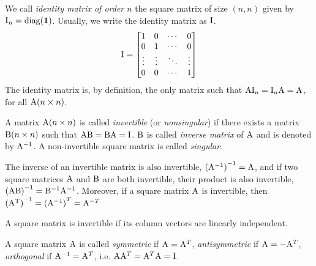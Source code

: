 \begin{definition}
    We call \textit{identity matrix of order $n$} the square matrix of size $(n, n)$ given by $\mathrm{I}_n = \mathrm{diag}(\mathbf{1})$. Usually, we write the identity matrix as $\mathrm{I}$.
    $$
        \mathrm{I} = \left[\begin{matrix}
        1 & 0 & \cdots & 0 \\
        0 & 1 & \cdots & 0 \\
        \vdots & \vdots & \ddots & \vdots \\
        0 & 0 & \cdots & 1
        \end{matrix}\right]
    $$
    The identity matrix is, by definition, the only matrix such that $\mathrm{A}\mathrm{I}_n = \mathrm{I}_n\mathrm{A} = \mathrm{A}$, for all $\mathrm{A}(n \times n)$.
\end{definition}

\begin{definition}
    A matrix $\mathrm{A}(n \times n)$ is called \textit{invertible} (or \textit{nonsingular}) if there exists a matrix $\mathrm{B}(n \times n)$ such that $\mathrm{A}\mathrm{B} = \mathrm{B}\mathrm{A} = \mathrm{I}$. $\mathrm{B}$ is called \textit{inverse matrix} of $\mathrm{A}$ and is denoted by $\mathrm{A}^{-1}$. A non-invertible square matrix is called \textit{singular}.
    
    The inverse of an invertible matrix is also invertible, $\mathrm{(\mathrm{A}^{-1})}^{-1} = \mathrm{A}$, and if two square matrices $\mathrm{A}$ and $\mathrm{B}$ are both invertible, their product is also invertible, $\mathrm{(AB)}^{-1} = \mathrm{B}^{-1}\mathrm{A}^{-1}$. Moreover, if a square matrix $\mathrm{A}$ is invertible, then $\mathrm{(\mathrm{A}^T)}^{-1} = \mathrm{(\mathrm{A}^{-1})}^T = \mathrm{A}^{-T}$
\end{definition}

\begin{proposition}
    A square matrix is invertible if its column vectors are linearly independent.
\end{proposition}



\begin{definition}
    A square matrix $\mathrm{A}$ is called \textit{symmetric} if $\mathrm{A} = \mathrm{A}^T$, \textit{antisymmetric} if $\mathrm{A} = -\mathrm{A}^T$, \textit{orthogonal} if $\mathrm{A}^{-1} = \mathrm{A}^T$, i.e. $\mathrm{A}\mathrm{A}^T = \mathrm{A}^T\mathrm{A} = \mathrm{I}$.
\end{definition}



